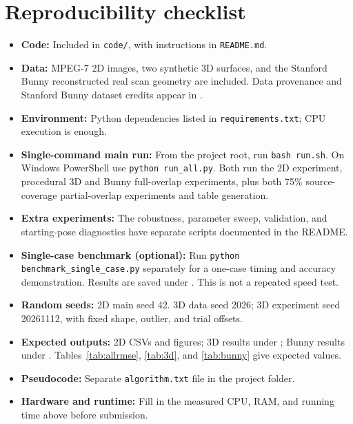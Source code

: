 \documentclass[11pt,a4paper]{article}
\begin{document}
\section{Reproducibility checklist}
\begin{itemize}[leftmargin=*,itemsep=3pt]
\item \textbf{Code:} Included in \texttt{code/}, with instructions in \texttt{README.md}.
\item \textbf{Data:} MPEG-7 2D images, two synthetic 3D surfaces, and the
Stanford Bunny reconstructed real scan geometry are included. Data provenance and Stanford Bunny dataset credits appear in .
\item \textbf{Environment:} Python dependencies listed in \texttt{requirements.txt}; CPU execution is enough.
\item \textbf{Single-command main run:} From the project root, run \texttt{bash run.sh}. On Windows PowerShell use \texttt{python run\_all.py}. Both run the 2D experiment, procedural 3D and Bunny full-overlap experiments,
plus both 75\% source-coverage partial-overlap experiments and table generation.
\item \textbf{Extra experiments:} The robustness, parameter sweep, validation, and starting-pose diagnostics have separate scripts documented in the README.
\item \textbf{Single-case benchmark (optional):} Run \texttt{python benchmark\_single\_case.py} separately for a one-case timing and accuracy demonstration. Results are saved under . This is not a repeated speed test.
\item \textbf{Random seeds:} 2D main seed 42. 3D data seed 2026; 3D experiment seed 20261112, with fixed shape, outlier, and trial offsets.
\item \textbf{Expected outputs:} 2D CSVs and figures; 3D results under
; Bunny results under .
Tables~\ref{tab:allrmse}, \ref{tab:3d}, and \ref{tab:bunny} give expected values.
\item \textbf{Pseudocode:} Separate \texttt{algorithm.txt} file in the project folder.
\item \textbf{Hardware and runtime:} Fill in the measured CPU, RAM, and running time above before submission.
\end{itemize}
\end{document}
